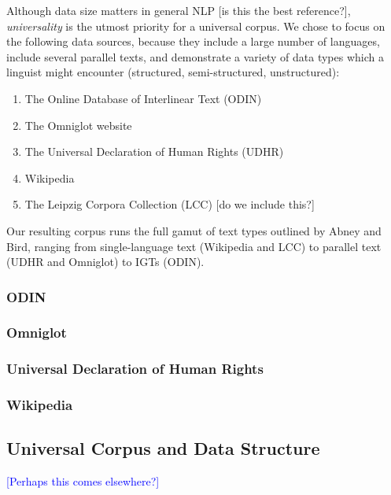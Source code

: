 Although data size matters in general NLP \cite{banko2001scaling} [is this the best reference?], \emph{universality} is the utmost priority for a universal corpus. We chose to focus on the following data sources, because they include a large number of languages, include several parallel texts, and demonstrate a variety of data types which a linguist might encounter (structured, semi-structured, unstructured):

\begin{enumerate}
\item The Online Database of Interlinear Text (ODIN)
\item The Omniglot website
\item The Universal Declaration of Human Rights (UDHR)
\item Wikipedia
\item The Leipzig Corpora Collection (LCC) [do we include this?]
\end{enumerate}


Our resulting corpus runs the full gamut of text types outlined by Abney and Bird, ranging from single-language text (Wikipedia and LCC) to parallel text (UDHR and Omniglot) to IGTs (ODIN).



\subsubsection{ODIN}

\subsubsection{Omniglot}

\subsubsection{Universal Declaration of Human Rights}

\subsubsection{Wikipedia}




\subsection{Universal Corpus and Data Structure} \label{sec:structure}

\textcolor{blue}{[Perhaps this comes elsewhere?]}

